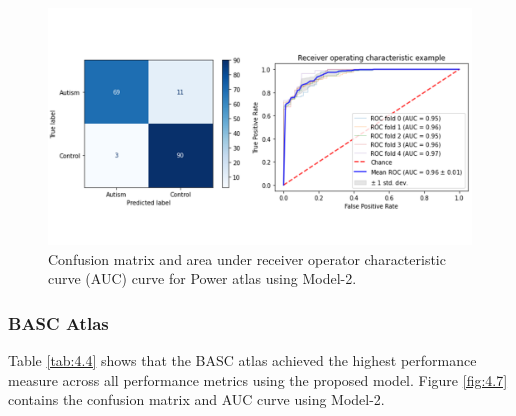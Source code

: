 \begin{figure}[h!]
\centering
\includegraphics[width=\linewidth]{figures/Figure 4.6.png}
\caption{Confusion matrix and area under receiver operator characteristic curve (AUC) curve for Power atlas using Model-2.}
\label{fig:4.6}
\end{figure}

\subsubsection{BASC Atlas}

Table \ref{tab:4.4} shows that the BASC atlas achieved the highest performance measure across all performance metrics using the proposed model. Figure \ref{fig:4.7} contains the confusion matrix and AUC curve using Model-2.

